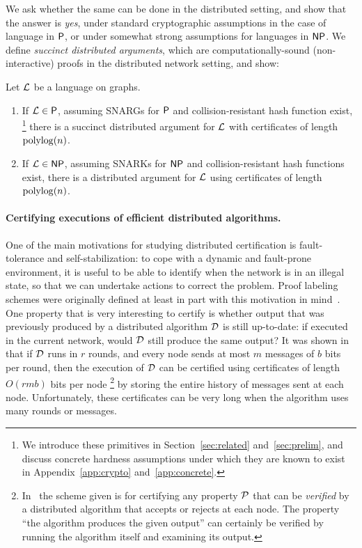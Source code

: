 We ask whether the same can be done in the distributed setting,	and show that the answer is \emph{yes}, under standard cryptographic assumptions in the case of language in ${\mathsf{P}}$, or under somewhat strong assumptions for languages in ${\mathsf{NP}}$. We define \emph{succinct distributed arguments}, which are computationally-sound (non-interactive) proofs in the distributed network setting, and show:
 \begin{theorem}\label{thm:centralized}
     Let $\mathcal{L}$ be a language on graphs.
     \begin{enumerate}
         \item If $\mathcal{L}\in{\mathsf{P}}$, assuming SNARGs for ${\mathsf{P}}$ and collision-resistant hash function exist,%
		\footnote{
            We introduce these primitives in Section~\ref{sec:related} and~\ref{sec:prelim}, and discuss concrete hardness assumptions under which they are known to exist  in Appendix~\ref{app:crypto} and~\ref{app:concrete}.
         	}
		 there is a succinct distributed argument for $\mathcal{L}$ with certificates of length $\operatorname{polylog}(n)$.
         \item If $\mathcal{L}\in {\mathsf{NP}}$, assuming SNARKs for ${\mathsf{NP}}$ and %
         collision-resistant hash functions exist,
	 there is a distributed argument for $\mathcal{L}$ using certificates of length $\operatorname{polylog}(n)$.    
     \end{enumerate}
 \end{theorem}

 \paragraph{Certifying executions of efficient distributed algorithms.}
	One of the main motivations for studying distributed certification is fault-tolerance and self-stabilization:
	to cope with a dynamic and fault-prone environment, it is useful to be able to identify when 
	the network is  in an illegal state, so that we can undertake actions to correct the problem.
	Proof labeling schemes were originally defined at least in part with this motivation in mind~\cite{korman2005proof}.
	One property that is very interesting to certify is whether output that was
	previously produced by a distributed algorithm $\mathcal{D}$
	is still up-to-date: if executed in the current network, would $\mathcal{D}$ still produce the same output?
	It was shown in~\cite{korman2005proof} that if $\mathcal{D}$ runs in $r$ rounds, and every node sends at most $m$ messages
	of $b$ bits per round,
	then the execution of $\mathcal{D}$ can be certified using certificates of length $O(r m b)$ bits per node%
	\footnote{In~\cite{korman2005proof} the scheme given is for certifying any property $\mathcal{P}$ that can be \emph{verified}
	by a distributed algorithm that accepts or rejects at each node. The property ``the algorithm produces the given output'' can certainly be verified by running the algorithm itself and examining its output.}
	by storing the entire history of messages sent at each node.
	Unfortunately, these certificates can be very long when the algorithm uses many rounds or messages.

